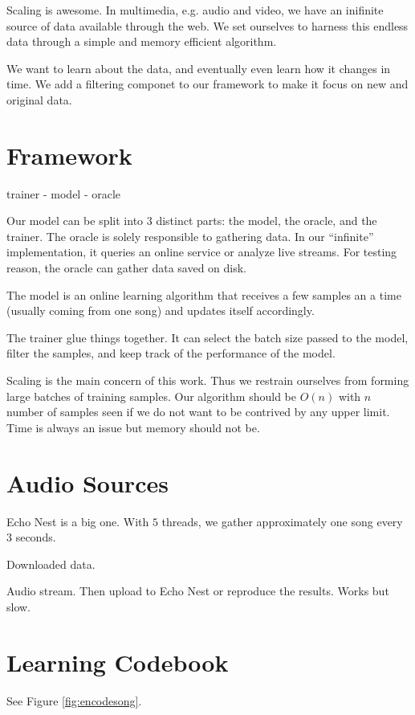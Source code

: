 \documentclass{sig-alternate}
\begin{document}
Scaling is awesome. In multimedia, e.g. audio and video, we have an
inifinite source of data available through the web. We set ourselves
to harness this endless data through a simple and memory efficient
algorithm.

We want to learn about the data, and eventually even learn how it
changes in time. We add a filtering componet to our framework
to make it focus on new and original data.


\section{Framework}
trainer - model - oracle

Our model can be split into $3$ distinct parts: the model, the oracle,
and the trainer. The oracle is solely responsible to gathering data.
In our ``infinite'' implementation, it queries an online service or
analyze live streams. For testing reason, the oracle can gather data
saved on disk.

The model is an online learning algorithm that receives a few samples
an a time (usually coming from one song) and updates itself accordingly.

The trainer glue things together. It can select the batch size passed
to the model, filter the samples, and keep track of the performance of
the model.

Scaling is the main concern of this work. Thus we restrain ourselves
from forming large batches of training samples. Our algorithm should be
$O(n)$ with $n$ number of samples seen if we do not want to be contrived
by any upper limit. Time is always an issue but memory should not be.


\section{Audio Sources}
Echo Nest is a big one. With $5$ threads, we gather approximately one song
every $3$ seconds.

Downloaded data.

Audio stream. Then upload to Echo Nest or reproduce the results. Works
but slow.

\section{Learning Codebook}

See Figure \ref{fig:encodesong}.
\end{document}
